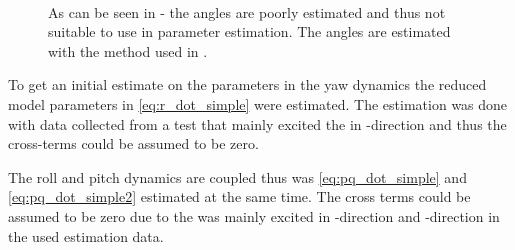 \begin{figure}[tbp]
  \centering
  \qquad
  \\
  \caption{\label{fig:integratedAngleVelocities}%
    As can be seen in \protect{}-\protect{} the angles are poorly estimated and thus not suitable to use in parameter estimation. The angles are estimated with the method used in .}
\end{figure}

To get an initial estimate on the parameters in the yaw dynamics the reduced model parameters in \eqref{eq:r_dot_simple}
were estimated. The estimation was done with data collected from a test that mainly excited the \abbrROV in \yawAngle-direction and thus the cross-terms could be assumed to be zero.

The roll and pitch dynamics are coupled thus was \eqref{eq:pq_dot_simple} and \eqref{eq:pq_dot_simple2} estimated at the same time.
The cross terms could be assumed to be zero due to the \abbrROV was mainly excited in \rollAngle-direction and \pitchAngle-direction in the used estimation data.

